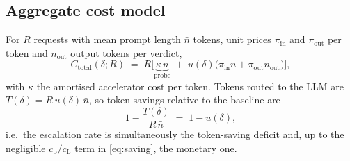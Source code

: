 \subsection{Aggregate cost model}

For $R$ requests with mean prompt length $\bar{n}$ tokens, unit prices $\pi_{\mathrm{in}}$
and $\pi_{\mathrm{out}}$ per token and $n_{\mathrm{out}}$ output tokens per verdict,
\begin{equation}
  C_{\mathrm{total}}(\delta;R)
  \;=\;R\Big[\underbrace{\kappa\,\bar{n}}_{\text{probe}}
    \;+\;u(\delta)\big(\pi_{\mathrm{in}}\bar{n}+\pi_{\mathrm{out}}n_{\mathrm{out}}\big)\Big],
  \label{eq:aggregate-cost}
\end{equation}
with $\kappa$ the amortised accelerator cost per token. Tokens routed to the LLM are
$T(\delta)=R\,u(\delta)\,\bar{n}$, so token savings relative to the baseline are
\begin{equation}
  1-\frac{T(\delta)}{R\,\bar{n}}\;=\;1-u(\delta),
  \label{eq:token-saving}
\end{equation}
i.e.\ the escalation rate is simultaneously the token-saving deficit and, up to the
negligible $c_{\mathrm{p}}/c_{\mathrm{L}}$ term in \eqref{eq:saving}, the monetary one.

